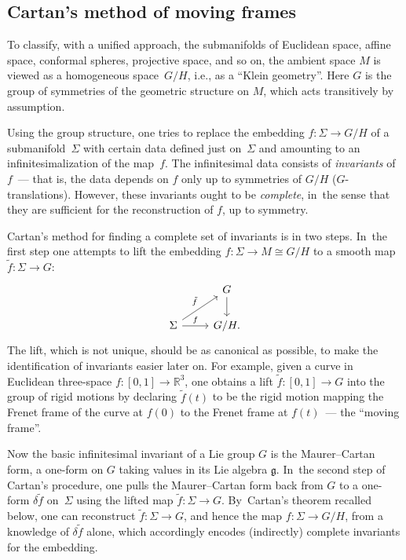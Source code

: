 \documentclass[10pt,a4paper]{amsart}
\numberwithin{equation}{section}
\begin{document}
\subsection*{Cartan's method of moving frames}

To classify, with a unified approach, the submanifolds of Euclidean
space, affine space, conformal spheres, projective space, and so on,
the ambient space $M$ is viewed as a homogeneous space~$G/H$, i.e., as
a ``Klein geometry''. Here $G$ is the group of symmetries of the
geometric structure on $M$, which acts transitively by assumption.

Using the group structure, one tries to replace the embedding $f
\colon \Sigma \rightarrow G/H$ of a sub\-ma\-ni\-fold~$\Sigma $ with certain
data defined just on~$\Sigma $ and amounting to an
infinitesimalization of the map~$f$. The infinitesimal data consists
of {\it invariants} of $f$~--- that is, the data depends on $f$ only
up to symmetries of $G/H$ ($G$-translations). However, these
invariants ought to be {\it complete}, in~the sense that they are
sufficient for the reconstruction of $f$, up to symmetry.

Cartan's method for finding a complete set of invariants is in two
steps. In~the first step one attempts to lift the embedding $f \colon
\Sigma \rightarrow M \cong G/H$ to a smooth map $\tilde f \colon
\Sigma \rightarrow G$:
\[
 \begin{tikzcd} {}& G \arrow{d}\\ \Sigma \arrow{ur}{\tilde f}
\arrow{r}{f} & G/H.
 \end{tikzcd}
\]
The lift, which is not unique, should be as canonical as possible,
to make the identification of invariants easier later on. For
example, given a curve in Euclidean three-space $f \colon [0,1]
\rightarrow {\mathbb R}^3$, one obtains a lift $\tilde f \colon [0,1]
\rightarrow G$ into the group of rigid motions by declaring $\tilde
f(t)$ to be the rigid motion mapping the Frenet frame of the curve at
$f(0)$ to the Frenet frame at $f(t)$~--- the ``moving frame''.

Now the basic infinitesimal invariant of a Lie group $G$ is the
Maurer--Cartan form, a one-form on $G$ taking values in its Lie algebra
${\mathfrak g} $. In~the second step of Cartan's procedure, one pulls
the Maurer--Cartan form back from $G$ to a one-form $\delta\tilde f $
on~$\Sigma $ using the lifted map $\tilde f \colon \Sigma \rightarrow
G$. By~Cartan's theorem recalled below, one can reconstruct $\tilde f
\colon \Sigma \rightarrow G$, and hence the map $f \colon \Sigma
\rightarrow G/H$, from a knowledge of $\delta\tilde f $ alone, which
accordingly encodes (indirectly) complete invariants for the
embedding.
\end{document}
